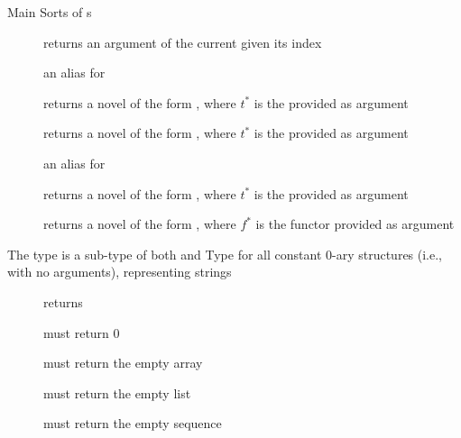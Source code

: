 \documentclass[handout]{beamer}
\begin{document}
\begin{frame}[allowframebreaks]{Main Sorts of s}
\begin{description}
        \item[] returns an argument of the current  given its index
        \item[] an alias for 
        \item[] returns a novel  of the form , where $t^*$ is the  provided as argument
        \item[] returns a novel  of the form , where $t^*$ is the  provided as argument
        \item[] an alias for 
        \item[] returns a novel  of the form , where $t^*$ is the  provided as argument
        \item[] returns a novel  of the form , where $f^*$ is the functor  provided as argument
    \end{description}

    \framebreak


    \framebreak

    \begin{block}{The  type is a sub-type of both  and }\centering
        Type for all constant 0-ary structures (i.e., with no arguments), representing strings
    \end{block}
    \begin{description}
        \item[] returns 
        \item[] must return 0
        \item[] must return the empty array
        \item[] must return the empty list
        \item[] must return the empty sequence
    \end{description}

    \framebreak



\end{frame}
\end{document}
